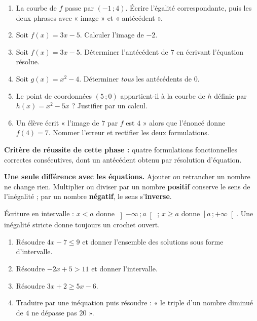 \documentclass[10pt,a4paper]{article}
\begin{document}
\begin{enumerate}
\needspace{18mm}
\item La courbe de $f$ passe par $(-1\,;4)$. Écrire l'égalité correspondante, puis les deux phrases avec « image » et « antécédent ».
\needspace{18mm}
\item Soit $f(x) = 3x - 5$. Calculer l'image de $-2$.
\needspace{18mm}
\item Soit $f(x) = 3x - 5$. Déterminer l'antécédent de $7$ en écrivant l'équation résolue.
\needspace{18mm}
\item Soit $g(x) = x^2 - 4$. Déterminer \emph{tous} les antécédents de $0$.
\needspace{18mm}
\item Le point de coordonnées $(5\,;0)$ appartient-il à la courbe de $h$ définie par $h(x) = x^2 - 5x$ ? Justifier par un calcul.
\needspace{18mm}
\item Un élève écrit « l'image de $7$ par $f$ est $4$ » alors que l'énoncé donne $f(4) = 7$. Nommer l'erreur et rectifier les deux formulations.
\end{enumerate}
\begin{successbox}\textbf{Critère de réussite de cette phase :} quatre formulations fonctionnelles correctes consécutives, dont un antécédent obtenu par résolution d'équation.\end{successbox}
\certline
\needspace{62mm}\par\vspace{3mm}
\begin{methodbox}
\textbf{Une seule différence avec les équations.} Ajouter ou retrancher un nombre ne change rien.
Multiplier ou diviser par un nombre \textbf{positif} conserve le sens de l'inégalité ; par un nombre
\textbf{négatif}, le sens s'\textbf{inverse}.
\par\smallskip
Écriture en intervalle : $x < a$ donne $\left]-\infty\,;a\right[$ ; $x \ge a$ donne $\left[a\,;+\infty\right[$.
Une inégalité stricte donne toujours un crochet ouvert.
\end{methodbox}
\begin{enumerate}
\needspace{18mm}
\item Résoudre $4x - 7 \le 9$ et donner l'ensemble des solutions sous forme d'intervalle.
\needspace{18mm}
\item Résoudre $-2x + 5 > 11$ et donner l'intervalle.
\needspace{18mm}
\item Résoudre $3x + 2 \ge 5x - 6$.
\needspace{18mm}
\item Traduire par une inéquation puis résoudre : « le triple d'un nombre diminué de $4$ ne dépasse pas $20$ ».
\end{enumerate}
\end{document}

